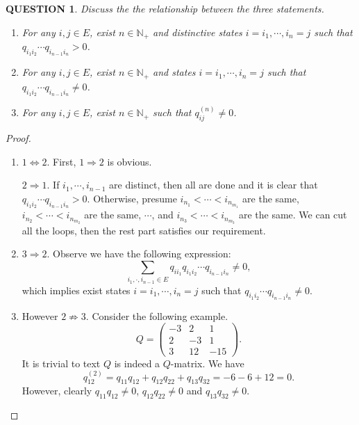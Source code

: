 \documentclass[12pt]{article}
\renewcommand{\(}{\left(}%
\renewcommand{\)}{\right)}%
\renewcommand{\[}{\left[}%
\renewcommand{\]}{\right]}%
\newcommand{\n}{\mathbb{N}}
\newtheorem{question}{QUESTION}[section]}
\newtheorem{proof}{Proof.}}
\begin{document}
  \begin{question}
  	Discuss the the relationship between the three statements.
  	\begin{enumerate}
  		\item For any $i,j\in E$, exist $n\in\n_+$ and distinctive states $i=i_1,\cdots,i_n=j$ such that $q_{i_1i_2}\cdots q_{i_{n-1}i_n}>0$.
  		\item For any $i,j\in E$, exist $n\in\n_+$ and states $i=i_1,\cdots,i_n=j$ such that $q_{i_1i_2}\cdots q_{i_{n-1}i_n}\neq 0$.
  		\item For any $i,j\in E$, exist $n\in\n_+$ such that $q_{ij}^{(n)}\neq 0$.
  	\end{enumerate}
  \end{question}
  \begin{proof}
  	\begin{enumerate}
  		\item $1\Longleftrightarrow 2$. First, $1\Longrightarrow 2$ is obvious. 
  		
  		$2\Longrightarrow 1$. If $i_1,\cdots, i_{n-1}$ are distinct, then all are done and it is clear that $q_{i_1i_2}\cdots q_{i_{n-1}i_n}>0$. Otherwise, presume $i_{n_1}<\cdots< i_{n_{m_1}}$ are the same, $i_{n_2}<\cdots< i_{n_{m_2}}$ are the same, $\cdots$, and $i_{n_3}<\cdots< i_{n_{m_3}}$ are the same. We can cut all the loops, then the rest part satisfies our requirement.
  		\item $3\Longrightarrow 2$. Observe we have the following expression:
  		\begin{equation*}
  			\sum_{i_1,\cdot,i_{n-1}\in E}q_{ii_1}q_{i_1i_2}\cdots q_{i_{n-1}i_n}\neq 0,
  		\end{equation*}
  		which implies exist states $i=i_1,\cdots,i_n=j$ such that $q_{i_1i_2}\cdots q_{i_{n-1}i_n}\neq 0$.
  		\item However $2\not\Longrightarrow 3$. Consider the following example.
  		\begin{equation*}
  			Q=\begin{pmatrix}
  				-3 & 2 & 1\\
  				2 & -3 & 1\\
  				3 & 12 & -15
  			\end{pmatrix}.
  		\end{equation*}
  		It is trivial to text $Q$ is indeed a $Q$-matrix. We have
  		\begin{equation*}
  			q_{12}^{(2)}=q_{11}q_{12}+q_{12}q_{22}+q_{13}q_{32}=-6-6+12=0.
  		\end{equation*}
  		However, clearly $q_{11}q_{12}\neq 0$, $q_{12}q_{22}\neq 0$ and $q_{13}q_{32}\neq 0$.
  	\end{enumerate}
  \end{proof}
  
\end{document}
